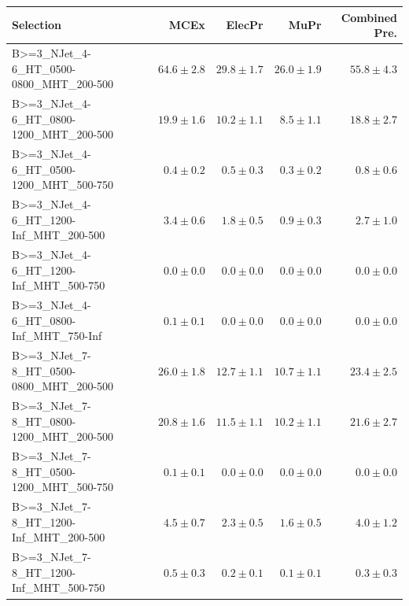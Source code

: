 \documentclass{beamer}
\begin{document}
\begin{frame}
\tiny
\begin{tabular}{lrrrr}
\toprule

                                                Selection  &                     MCEx  &           ElecPr  &             MuPr  &          Combined Pre.  \\
\midrule
     B>=3\_NJet\_4-6\_HT\_0500-0800\_MHT\_200-500 &              $64.6\pm2.8$&              $29.8\pm1.7$&              $26.0\pm1.9$&                  $55.8\pm4.3$ \\
     B>=3\_NJet\_4-6\_HT\_0800-1200\_MHT\_200-500 &              $19.9\pm1.6$&              $10.2\pm1.1$&               $8.5\pm1.1$&                  $18.8\pm2.7$ \\
     B>=3\_NJet\_4-6\_HT\_0500-1200\_MHT\_500-750 &               $0.4\pm0.2$&               $0.5\pm0.3$&               $0.3\pm0.2$&                   $0.8\pm0.6$ \\
      B>=3\_NJet\_4-6\_HT\_1200-Inf\_MHT\_200-500 &               $3.4\pm0.6$&               $1.8\pm0.5$&               $0.9\pm0.3$&                   $2.7\pm1.0$ \\
      B>=3\_NJet\_4-6\_HT\_1200-Inf\_MHT\_500-750 &               $0.0\pm0.0$&               $0.0\pm0.0$&               $0.0\pm0.0$&                   $0.0\pm0.0$ \\
      B>=3\_NJet\_4-6\_HT\_0800-Inf\_MHT\_750-Inf &               $0.1\pm0.1$&               $0.0\pm0.0$&               $0.0\pm0.0$&                   $0.0\pm0.0$ \\
     B>=3\_NJet\_7-8\_HT\_0500-0800\_MHT\_200-500 &              $26.0\pm1.8$&              $12.7\pm1.1$&              $10.7\pm1.1$&                  $23.4\pm2.5$ \\
     B>=3\_NJet\_7-8\_HT\_0800-1200\_MHT\_200-500 &              $20.8\pm1.6$&              $11.5\pm1.1$&              $10.2\pm1.1$&                  $21.6\pm2.7$ \\
     B>=3\_NJet\_7-8\_HT\_0500-1200\_MHT\_500-750 &               $0.1\pm0.1$&               $0.0\pm0.0$&               $0.0\pm0.0$&                   $0.0\pm0.0$ \\
      B>=3\_NJet\_7-8\_HT\_1200-Inf\_MHT\_200-500 &               $4.5\pm0.7$&               $2.3\pm0.5$&               $1.6\pm0.5$&                   $4.0\pm1.2$ \\
      B>=3\_NJet\_7-8\_HT\_1200-Inf\_MHT\_500-750 &               $0.5\pm0.3$&               $0.2\pm0.1$&               $0.1\pm0.1$&                   $0.3\pm0.3$ \\

\end{tabular}
\end{frame}
\end{document}
